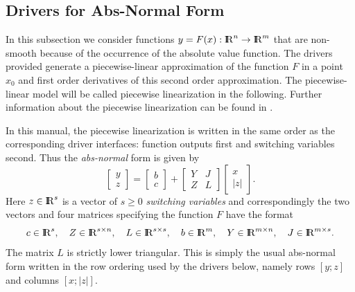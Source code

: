 %
\subsection{Drivers for Abs-Normal Form}
\label{absdrivers}
%
In this subsection we consider functions $y=F(x):{ {\rm I} \kern -.225em {\rm R} }^n \rightarrow { {\rm I} \kern -.225em {\rm R} }^m$ that are non-smooth because of the occurrence of 
the absolute value function. The drivers provided generate a piecewise-linear 
approximation of the function $F$ in a point $x_0$ and first order derivatives of 
this second order approximation. The piecewise-linear model will be called piecewise 
linearization in the following. Further information about the piecewise linearization 
can be found in \cite{Griewank13}.

In this manual, the piecewise linearization is written in the same order as
the corresponding driver interfaces: function outputs first and switching
variables second. Thus the \textit{abs-normal} form is given by
\[ \left[\begin{array}{c}
          y\\z
         \end{array}\right]
   =\left[\begin{array}{c}
          b\\c
         \end{array}\right]      
    +\left[\begin{array}{cc}
          Y & J\\ Z & L
         \end{array}\right] 
    \left[\begin{array}{c}
          x\\|z|
         \end{array}\right].
\]
Here $z\in{ {\rm I} \kern -.225em {\rm R} }^s$ is a vector of $s\ge 0$ \textit{switching variables} and correspondingly 
the two vectors and four matrices specifying the function $F$ have the format
\[c\in{ {\rm I} \kern -.225em {\rm R} }^s,\quad Z\in{ {\rm I} \kern -.225em {\rm R} }^{s\times n},\quad L\in{ {\rm I} \kern -.225em {\rm R} }^{s\times s},\quad b\in { {\rm I} \kern -.225em {\rm R} }^m,\quad Y\in{ {\rm I} \kern -.225em {\rm R} }^{m\times n},\quad J\in{ {\rm I} \kern -.225em {\rm R} }^{m\times s}.\]
The matrix $L$ is strictly lower triangular.
This is simply the usual abs-normal form written in the row ordering used by
the drivers below, namely rows $[y;z]$ and columns $[x;|z|]$.


